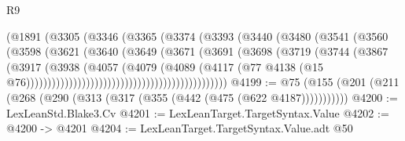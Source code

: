 \begin{lexlean}{R9}
\begin{coremodule}
{{{{{{{{{{{{{{{{{{{{{{{{{{{{{{{{{{{{{{{{{{{{{{{{{{{{{{{{{{{{{{{{{{{{{{{{{{{{{{{{{{{{{{{{{{{{{{{{{{{{{{{{{{{{                                          (@1891
                                            (@3305
                                              (@3346
                                                (@3365
                                                  (@3374
                                                    (@3393
                                                      (@3440
                                                        (@3480
                                                          (@3541
                                                            (@3560
                                                              (@3598
                                                                (@3621
                                                                  (@3640
                                                                    (@3649
                                                                      (@3671
                                                                        (@3691
                                                                          (@3698
                                                                            (@3719
                                                                              (@3744
                                                                                (@3867
                                                                                  (@3917
                                                                                    (@3938
                                                                                      (@4057
                                                                                        (@4079
                                                                                          (@4089
                                                                                            (@4117
                                                                                              (@77
                                                                                                @4138
                                                                                                (@15
                                                                                                  @76)))))))))))))))))))))))))))))))))))))))))))))))
@4199 := @75 (@155 (@201 (@211 (@268 (@290 (@313 (@317 (@355 (@442 (@475 (@622 @4187)))))))))))
@4200 := LexLeanStd.Blake3.Cv
@4201 := LexLeanTarget.TargetSyntax.Value
@4202 := @4200 -> @4201
@4204 := LexLeanTarget.TargetSyntax.Value.adt @50
}}}}}}}}}}}}}}}}}}}}}}}}}}}}}}}}}}}}}}}}}}}}}}}}}}}}}}}}}}}}}}}}}}}}}}}}}}}}}}}}}}}}}}}}}}}}}}}}}}}}}}}}}}}}
\end{coremodule}
\end{lexlean}
